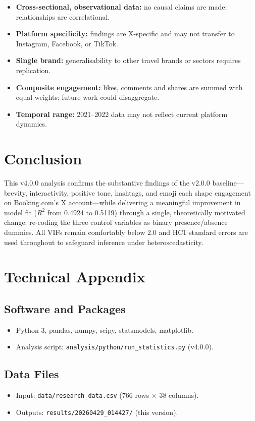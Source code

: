 \documentclass[12pt,a4paper]{article}
\begin{document}
\begin{itemize}
    \item \textbf{Cross-sectional, observational data:} no causal claims are made; relationships are correlational.
    \item \textbf{Platform specificity:} findings are X-specific and may not transfer to Instagram, Facebook, or TikTok.
    \item \textbf{Single brand:} generalisability to other travel brands or sectors requires replication.
    \item \textbf{Composite engagement:} likes, comments and shares are summed with equal weights; future work could disaggregate.
    \item \textbf{Temporal range:} 2021--2022 data may not reflect current platform dynamics.
\end{itemize}

\section{Conclusion}

This v4.0.0 analysis confirms the substantive findings of the v2.0.0 baseline---brevity, interactivity, positive tone, hashtags, and emoji each shape engagement on Booking.com's X account---while delivering a meaningful improvement in model fit ($R^2$ from 0.4924 to 0.5119) through a single, theoretically motivated change: re-coding the three control variables as binary presence/absence dummies. All VIFs remain comfortably below 2.0 and HC1 standard errors are used throughout to safeguard inference under heteroscedasticity.

\appendix
\section{Technical Appendix}

\subsection{Software and Packages}
\begin{itemize}
    \item Python 3, pandas, numpy, scipy, statsmodels, matplotlib.
    \item Analysis script: \texttt{analysis/python/run\_statistics.py} (v4.0.0).
\end{itemize}

\subsection{Data Files}
\begin{itemize}
    \item Input: \texttt{data/research\_data.csv} (766 rows $\times$ 38 columns).
    \item Outputs: \texttt{results/20260429\_014427/} (this version).
\end{itemize}
\end{document}
